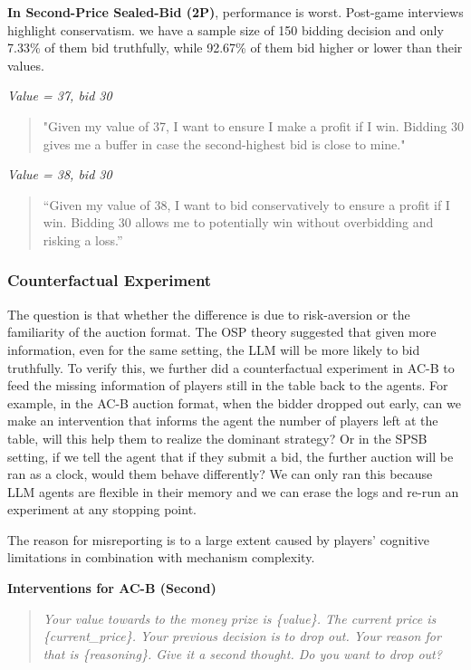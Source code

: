 \documentclass{article} %
\begin{document}
\textbf{In Second-Price Sealed-Bid (2P)}, performance is worst. 
Post-game interviews highlight conservatism.
we have a sample size of 150 bidding decision and only 7.33\% of them bid truthfully, while 92.67\% of them bid higher or lower than their values. 


\textit{Value = 37, bid 30}
\begin{quote}
    "Given my value of 37, I want to ensure I make a profit if I win. Bidding 30 gives me a buffer in case the second-highest bid is close to mine."
\end{quote}

\textit{Value = 38, bid 30}
\begin{quote}
    “Given my value of 38, I want to bid conservatively to ensure a profit if I win. Bidding 30 allows me to potentially win without overbidding and risking a loss.”
\end{quote}


\subsubsection{Counterfactual Experiment}

The question is that whether the difference is due to risk-aversion or the familiarity of the auction format. 
The OSP theory suggested that given more information, even for the same setting, the LLM will be more likely to bid truthfully.
To verify this, we further did a counterfactual experiment in AC-B to feed the missing information of players still in the table back to the agents. 
For example, in the AC-B auction format, when the bidder dropped out early, can we make an intervention that informs the agent the number of players left at the table, will this help them to realize the dominant strategy?
Or in the SPSB setting, if we tell the agent that if they submit a bid, the further auction will be ran as a clock, would them behave differently?
We can only ran this because LLM agents are flexible in their memory and we can erase the logs and re-run an experiment at any stopping point.

The reason for misreporting is to a large extent caused by players’ cognitive limitations in combination with mechanism complexity. 

\textbf{Interventions for AC-B (Second)}
\begin{quote}
\textit{    Your value towards to the money prize is \{value\}.
    The current price is \{current\_price\}.
    Your previous decision is to drop out. Your reason for that is \{reasoning\}.
    Give it a second thought. Do you want to drop out?}
\end{quote}
\end{document}
